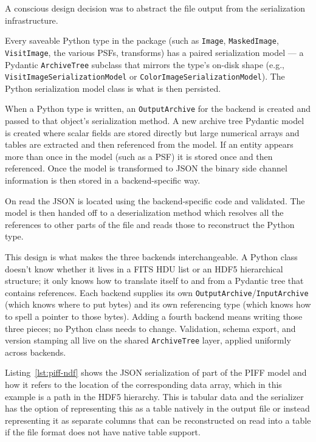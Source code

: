 A conscious design decision was to abstract the file output from the serialization infrastructure.

Every saveable Python type in the package (such as \texttt{Image}, \texttt{MaskedImage}, \texttt{VisitImage}, the various PSFs, transforms) has a paired serialization model — a Pydantic \texttt{ArchiveTree} subclass that mirrors the type's on-disk shape (e.g., \texttt{VisitImageSerializationModel} or \texttt{ColorImageSerializationModel}).
The Python serialization model class is what is then persisted.

When a Python type is written, an \texttt{OutputArchive} for the backend is created and passed to that object's serialization method.
A new archive tree Pydantic model is created where scalar fields are stored directly but large numerical arrays and tables are extracted and then referenced from the model.
If an entity appears more than once in the model (such as a PSF) it is stored once and then referenced.
Once the model is transformed to JSON the binary side channel information is then stored in a backend-specific way.

On read the JSON is located using the backend-specific code and validated.
The model is then handed off to a deserialization method which resolves all the references to other parts of the file and reads those to reconstruct the Python type.

This design is what makes the three backends interchangeable.
A Python class doesn't know whether it lives in a FITS HDU list or an HDF5 hierarchical structure; it only knows how to translate itself to and from a Pydantic tree that contains references.
Each backend supplies its own \texttt{OutputArchive}/\texttt{InputArchive} (which knows where to put bytes) and its own referencing type (which knows how to spell a pointer to those bytes).
Adding a fourth backend means writing those three pieces; no Python class needs to change.
Validation, schema export, and version stamping all live on the shared \texttt{ArchiveTree} layer, applied uniformly across backends.

Listing~\ref{lst:piff-ndf} shows the JSON serialization of part of the PIFF model and how it refers to the location of the corresponding data array, which in this example is a path in the HDF5 hierarchy.
This is tabular data and the serializer has the option of representing this as a table natively in the output file or instead representing it as separate columns that can be reconstructed on read into a table if the file format does not have native table support.

